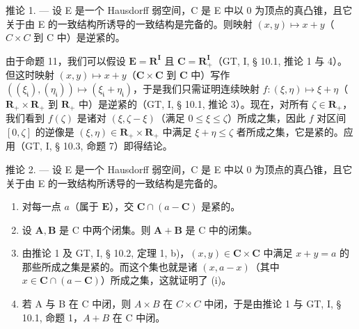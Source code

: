 推论 1. --- 设 E 是一个 Hausdorff 弱空间，C 是 E 中以 0 为顶点的真凸锥，且它关于由 E 的一致结构所诱导的一致结构是完备的。则映射 \((x, y) \mapsto x + y\)（\(C \times C\) 到 C 中）是逆紧的。

由于命题 11，我们可以假设 \(\mathbf{E} = \mathbf{R}^{\mathbf{I}}\) 且 \(\mathbf{C} = \mathbf{R}_{+}^{\mathbf{I}}\)（GT, I, § 10.1, 推论 1 与 4）。但这时映射 \((x, y) \mapsto x + y\)（\(\mathbf{C} \times \mathbf{C}\) 到 \(\mathbf{C}\) 中）写作 \(((\xi_{\mathfrak{i}}), (\eta_{\mathfrak{i}})) \mapsto (\xi_{\mathfrak{i}} + \eta_{\mathfrak{i}})\)，于是我们只需证明连续映射 \(f: (\xi, \eta) \mapsto \xi + \eta\)（\(\mathbf{R}_{+} \times \mathbf{R}_{+}\) 到 \(\mathbf{R}_{+}\) 中）是逆紧的（GT, I, § 10.1, 推论 3）。现在，对所有 \(\zeta \in \mathbf{R}_{+}\)，我们看到 \(f(\zeta)\) 是诸对 \((\xi, \zeta - \xi)\)（满足 \(0 \leqslant \xi \leqslant \zeta\)）所成之集，因此 \(f\) 对区间 \([0, \zeta]\) 的逆像是 \((\xi, \eta) \in \mathbf{R}_{+} \times \mathbf{R}_{+}\) 中满足 \(\xi + \eta \leqslant \zeta\) 者所成之集，它是紧的。应用（GT, I, § 10.3, 命题 7）即得结论。

推论 2. --- 设 E 是一个 Hausdorff 弱空间，C 是 E 中以 0 为顶点的真凸锥，且它关于由 E 的一致结构所诱导的一致结构是完备的。

\begin{enumerate}
\def\labelenumi{(\roman{enumi})}
\item
  对每一点 \(a\)（属于 \(\mathbf{E}\)），交 \(\mathbf{C} \cap (a - \mathbf{C})\) 是紧的。
\item
  设 \(\mathbf{A},\mathbf{B}\) 是 C 中两个闭集。则 \(\mathbf{A} + \mathbf{B}\) 是 C 中的闭集。
\item
  由推论 1 及 GT, I, § 10.2, 定理 1, b)，\((x, y) \in \mathbf{C} \times \mathbf{C}\) 中满足 \(x + y = a\) 的那些所成之集是紧的。而这个集也就是诸 \((x, a - x)\)（其中 \(x \in \mathbf{C} \cap (a - \mathbf{C})\)）所成之集，这就证明了 (i)。
\item
  若 A 与 B 在 C 中闭，则 \(A \times B\) 在 \(C \times C\) 中闭，于是由推论 1 与 GT, I, § 10.1, 命题 1，\(A + B\) 在 C 中闭。
\end{enumerate}

